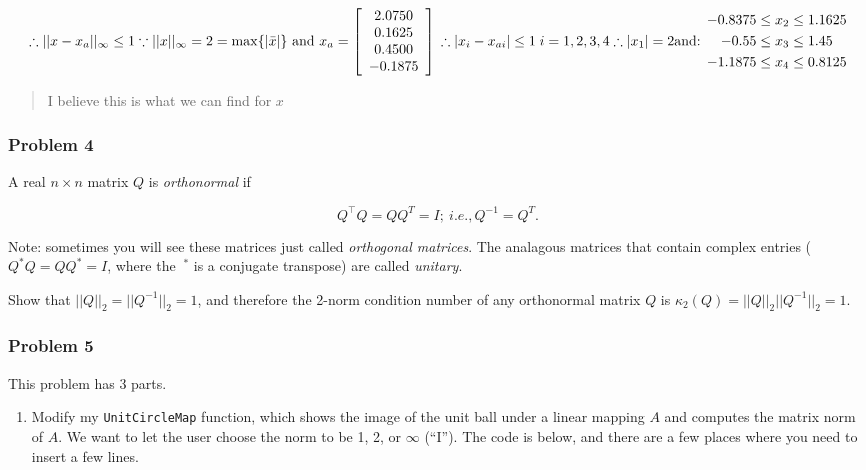 \documentclass[]{article}
\providecommand{\tightlist}{%
  \setlength{\itemsep}{0pt}\setlength{\parskip}{0pt}}
\begin{document}
\[
\therefore ||x-x_{a}||_{\infty} \leq 1\\
\because ||x||_{\infty} = 2 = \max\{|\bar{x}|\} \text{ and } x_{a}=\left[\begin{array}{c}2.0750 \\ 0.1625 \\ 0.4500 \\ -0.1875 \end{array}\right]\\
\therefore |x_{i}-x_{ai}|\leq 1 \; i=1,2,3,4 \\
\therefore |x_{1}|=2\\
\text{and:  } 
\begin{aligned}-0.8375 & \leq x_{2} \leq 1.1625 \\-0.55 & \leq x_{3} \leq 1.45 \\-1.1875 & \leq x_{4} \leq 0.8125 \end{aligned}
\]

\begin{quote}
I believe this is what we can find for \(x\)
\end{quote}

\hypertarget{problem-4}{%
\subsubsection{Problem 4}\label{problem-4}}

A real \(n \times n\) matrix \(Q\) is \emph{orthonormal} if

\[ Q^{\top}Q=QQ^T=I;~i.e., Q^{-1}=Q^T.\]

Note: sometimes you will see these matrices just called \emph{orthogonal
matrices}. The analagous matrices that contain complex entries
(\(Q^*Q=QQ^*=I\), where the \(~^*\) is a conjugate transpose) are called
\emph{unitary}.

Show that \(||Q||_2=||Q^{-1}||_2=1\), and therefore the 2-norm condition
number of any orthonormal matrix \(Q\) is
\(\kappa_2(Q)=||Q||_2 ||Q^{-1}||_2=1\).

\hypertarget{problem-5}{%
\subsubsection{Problem 5}\label{problem-5}}

This problem has 3 parts.

\begin{enumerate}
\def\labelenumi{(\alph{enumi})}
\tightlist
\item
  Modify my \texttt{UnitCircleMap} function, which shows the image of
  the unit ball under a linear mapping \(A\) and computes the matrix
  norm of \(A\). We want to let the user choose the norm to be 1, 2, or
  \(\infty\) (``I''). The code is below, and there are a few places
  where you need to insert a few lines.
\end{enumerate}
\end{document}

